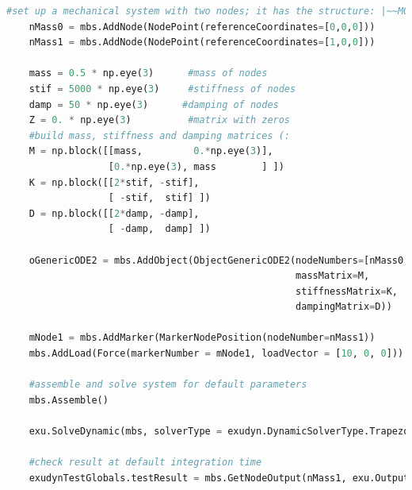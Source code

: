 \label{miniExample_ObjectGenericODE2}
\pythonstyle
\begin{lstlisting}[language=Python, firstnumber=1]
    #set up a mechanical system with two nodes; it has the structure: |~~M0~~M1
    nMass0 = mbs.AddNode(NodePoint(referenceCoordinates=[0,0,0]))
    nMass1 = mbs.AddNode(NodePoint(referenceCoordinates=[1,0,0]))

    mass = 0.5 * np.eye(3)      #mass of nodes
    stif = 5000 * np.eye(3)     #stiffness of nodes
    damp = 50 * np.eye(3)      #damping of nodes
    Z = 0. * np.eye(3)          #matrix with zeros
    #build mass, stiffness and damping matrices (:
    M = np.block([[mass,         0.*np.eye(3)],
                  [0.*np.eye(3), mass        ] ])
    K = np.block([[2*stif, -stif],
                  [ -stif,  stif] ])
    D = np.block([[2*damp, -damp],
                  [ -damp,  damp] ])
    
    oGenericODE2 = mbs.AddObject(ObjectGenericODE2(nodeNumbers=[nMass0,nMass1], 
                                                   massMatrix=M, 
                                                   stiffnessMatrix=K,
                                                   dampingMatrix=D))
    
    mNode1 = mbs.AddMarker(MarkerNodePosition(nodeNumber=nMass1))
    mbs.AddLoad(Force(markerNumber = mNode1, loadVector = [10, 0, 0])) #static solution=10*(1/5000+1/5000)=0.0004

    #assemble and solve system for default parameters
    mbs.Assemble()
    
    exu.SolveDynamic(mbs, solverType = exudyn.DynamicSolverType.TrapezoidalIndex2)

    #check result at default integration time
    exudynTestGlobals.testResult = mbs.GetNodeOutput(nMass1, exu.OutputVariableType.Position)[0]

\end{lstlisting}

